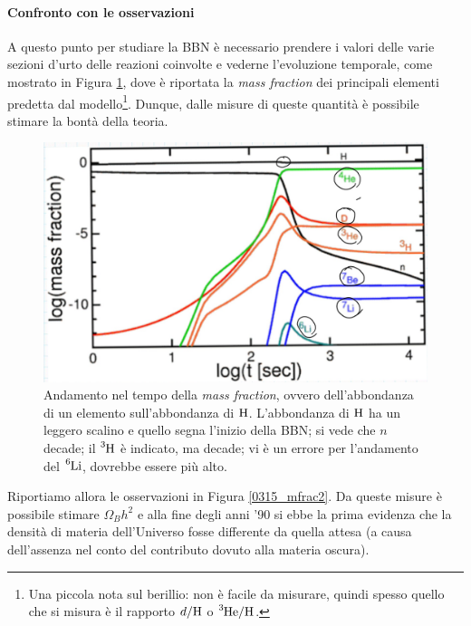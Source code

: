 \paragraph{Confronto con le osservazioni} A questo punto per studiare la BBN è necessario prendere i valori delle varie sezioni d'urto delle reazioni coinvolte e vederne l'evoluzione temporale, come mostrato in Figura \ref{0315_mfrac}, dove è riportata la \textit{mass fraction} dei principali elementi predetta dal modello\footnote{Una piccola nota sul berillio: non è facile da misurare, quindi spesso quello che si misura è il rapporto $d/\ce{H}$ o $\ce{^3He/H}$.}. Dunque, dalle misure di queste quantità è possibile stimare la bontà della teoria.

\begin{figure}[!h]
    \centering
    \includegraphics[scale=0.2]{Immagini/0315_massfraction.png}
    \caption{Andamento nel tempo della \textit{mass fraction}, ovvero dell'abbondanza di un elemento sull'abbondanza di $\ce{H}$. L'abbondanza di $\ce{H}$ ha un leggero scalino e quello segna l'inizio della BBN; si vede che $n$ decade; il $\ce{^3H}$ è indicato, ma decade; vi è un errore per l'andamento del $\ce{^6Li}$, dovrebbe essere più alto.}
    \label{0315_mfrac}
\end{figure}

\noindent Riportiamo allora le osservazioni in Figura \ref{0315_mfrac2}. Da queste misure è possibile stimare $\Omega_B h^2$ e alla fine degli anni '90 si ebbe la prima evidenza che la densità di materia dell'Universo fosse differente da quella attesa (a causa dell'assenza nel conto del contributo dovuto alla materia oscura). 

